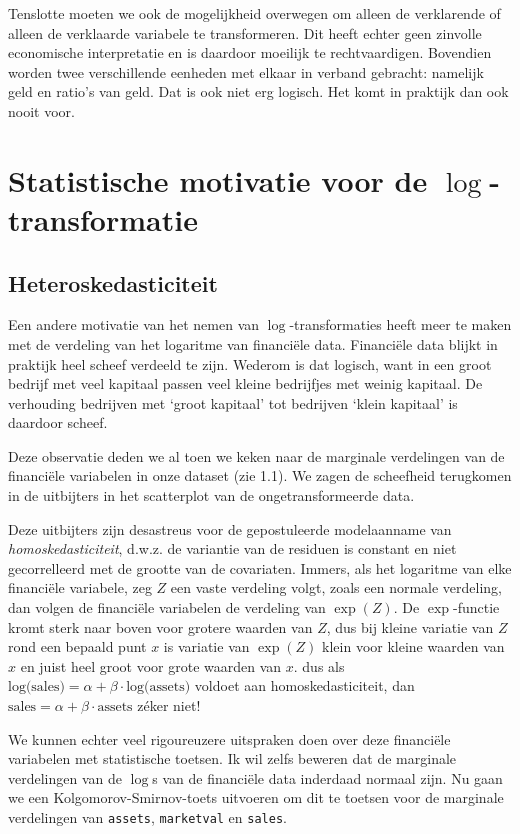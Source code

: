 \documentclass[a4paper]{report}
\begin{document}
  Tenslotte moeten we ook de mogelijkheid overwegen om alleen de verklarende of alleen de verklaarde variabele te transformeren. Dit heeft echter geen zinvolle economische interpretatie en is daardoor moeilijk te rechtvaardigen. Bovendien worden twee verschillende eenheden met elkaar in verband gebracht: namelijk geld en ratio's van geld. Dat is ook niet erg logisch. Het komt in praktijk dan ook nooit voor.
 
\section{Statistische motivatie voor de $\log$-transformatie} 
\subsection{Heteroskedasticiteit}
  Een andere motivatie van het nemen van $\log$-transformaties heeft meer te maken met de verdeling van het logaritme van financi\"ele data. Financi\"ele data blijkt in praktijk heel scheef verdeeld te zijn. Wederom is dat logisch, want in een groot bedrijf met veel kapitaal passen veel kleine bedrijfjes met weinig kapitaal. De verhouding bedrijven met `groot kapitaal' tot bedrijven `klein kapitaal' is daardoor scheef. 
  
  Deze observatie deden we al toen we keken naar de marginale verdelingen van de financi\"ele variabelen in onze dataset (zie 1.1). We zagen de scheefheid terugkomen in de uitbijters in het scatterplot van de ongetransformeerde data.
  
  Deze uitbijters zijn desastreus voor de gepostuleerde modelaanname van \emph{homoskedasticiteit}, d.w.z. de variantie van de residuen is constant en niet gecorrelleerd met de grootte van de covariaten. Immers, als het logaritme van elke financi\"ele variabele, zeg $Z$ een vaste verdeling volgt, zoals een normale verdeling, dan volgen de financi\"ele variabelen de verdeling van $\exp(Z)$. De $\exp$-functie kromt sterk naar boven voor grotere waarden van $Z$, dus bij kleine variatie van $Z$ rond een bepaald punt $x$ is variatie van $\exp(Z)$ klein voor kleine waarden van $x$ en juist heel groot voor grote waarden van $x$. dus als $\text{log(sales)} = \alpha + \beta \cdot \text{log(assets)}$ voldoet aan homoskedasticiteit, dan $\text{sales} = \alpha + \beta \cdot \text{assets}$ z\' eker niet!
  
  We kunnen echter veel rigoureuzere uitspraken doen over deze financi\"ele variabelen met statistische toetsen. Ik wil zelfs beweren dat de marginale verdelingen van de $\log$s van de financi\"ele data inderdaad normaal zijn. Nu gaan we een Kolgomorov-Smirnov-toets uitvoeren om dit te toetsen voor de marginale verdelingen van \verb!assets!, \verb!marketval! en \verb!sales!.
  
\end{document}
